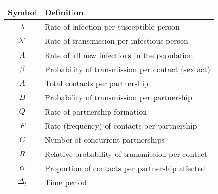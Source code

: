 \begin{tabular}{cl}
  \toprule
    Symbol   & Definition                                        \\
  \midrule
  $\lambda$  & Rate of infection per susceptible person          \\
  $\lambda'$ & Rate of transmission per infectious person        \\
  $\Lambda$  & Rate of all new infections in the population      \\
   $\beta$   & Probability of transmission per contact (sex act) \\
     $A$     & Total contacts per partnership                    \\
     $B$     & Probability of transmission per partnership       \\
     $Q$     & Rate of partnership formation                     \\
     $F$     & Rate (frequency) of contacts per partnership      \\
     $C$     & Number of concurrent partnerships                 \\
     $R$     & Relative probability of transmission per contact  \\
   $\alpha$  & Proportion of contacts per partnership affected   \\
  $\Delta_t$ & Time period                                       \\
  \bottomrule
\end{tabular}